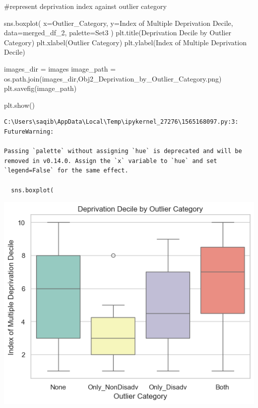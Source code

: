 \documentclass[
  letterpaper,
  DIV=11,
  numbers=noendperiod]{scrartcl}
\newenvironment{Shaded}{\begin{snugshade}}{\end{snugshade}}
\newcommand{\CommentTok}[1]{\textcolor[rgb]{0.37,0.37,0.37}{#1}}
\newcommand{\NormalTok}[1]{\textcolor[rgb]{0.00,0.23,0.31}{#1}}
\newcommand{\OperatorTok}[1]{\textcolor[rgb]{0.37,0.37,0.37}{#1}}
\newcommand{\StringTok}[1]{\textcolor[rgb]{0.13,0.47,0.30}{#1}}
\begin{document}
\begin{Shaded}
\begin{Highlighting}[]
\CommentTok{\#represent deprivation index against outlier category }

\NormalTok{sns.boxplot(}
\NormalTok{    x}\OperatorTok{=}\StringTok{\textquotesingle{}Outlier\_Category\textquotesingle{}}\NormalTok{, }
\NormalTok{    y}\OperatorTok{=}\StringTok{\textquotesingle{}Index of Multiple Deprivation Decile\textquotesingle{}}\NormalTok{, }
\NormalTok{    data}\OperatorTok{=}\NormalTok{merged\_df\_2, }
\NormalTok{    palette}\OperatorTok{=}\StringTok{\textquotesingle{}Set3\textquotesingle{}}
\NormalTok{)}
\NormalTok{plt.title(}\StringTok{\textquotesingle{}Deprivation Decile by Outlier Category\textquotesingle{}}\NormalTok{)}
\NormalTok{plt.xlabel(}\StringTok{\textquotesingle{}Outlier Category\textquotesingle{}}\NormalTok{)}
\NormalTok{plt.ylabel(}\StringTok{\textquotesingle{}Index of Multiple Deprivation Decile\textquotesingle{}}\NormalTok{)}

\NormalTok{images\_dir }\OperatorTok{=} \StringTok{\textquotesingle{}images\textquotesingle{}}
\NormalTok{image\_path }\OperatorTok{=}\NormalTok{ os.path.join(images\_dir,}\StringTok{\textquotesingle{}Obj2\_Deprivation\_by\_Outlier\_Category.png\textquotesingle{}}\NormalTok{)}
\NormalTok{plt.savefig(image\_path)}

\NormalTok{plt.show()}

\end{Highlighting}
\end{Shaded}

\begin{verbatim}
C:\Users\saqib\AppData\Local\Temp\ipykernel_27276\1565168097.py:3: FutureWarning: 

Passing `palette` without assigning `hue` is deprecated and will be removed in v0.14.0. Assign the `x` variable to `hue` and set `legend=False` for the same effect.

  sns.boxplot(
\end{verbatim}

\includegraphics{P4DS_A2_Data_Analysis_Project_files/figure-pdf/cell-78-output-2.png}
\end{document}
